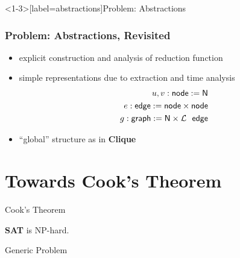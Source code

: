 \documentclass[11pt,usenames,dvipsnames,
  hyperref={pdfencoding=auto,psdextra}]{beamer}
\newcommand{\colorHOne}{\color{red}}
\begin{document}
\begin{frame}<1-3>[label=abstractions]{Problem: Abstractions}
  \frametitle<4>{Problem: Abstractions, Revisited}
  \begin{itemize}
    \item explicit construction and analysis of reduction function 
    \item<2-> simple representations due to extraction and time analysis
      \begin{align*}
        u,v : \textsf{node} := \mathsf{N} \\
        e : \textsf{edge} := \textsf{node} \times \textsf{node}\\
        g : \textsf{graph} := \mathsf{N} \times \mathcal{L}~~\textsf{edge} 
      \end{align*}
    \item<3-> {\only<4>{\colorHOne} {``global'' structure as in \textbf{Clique}}}
  \end{itemize}
\end{frame}

\section{Towards Cook's Theorem}
\begin{frame}{Cook's Theorem}
  \begin{block}{\vspace*{-3ex}}
    \textbf{SAT} is NP-hard.
  \end{block}

  \vspace{5ex}

  \begin{block}{Generic Problem}
    \begin{overlayarea}{\textwidth}{0.25\textwidth}
  \end{overlayarea}
  \end{block}
\end{frame}
\end{document}
